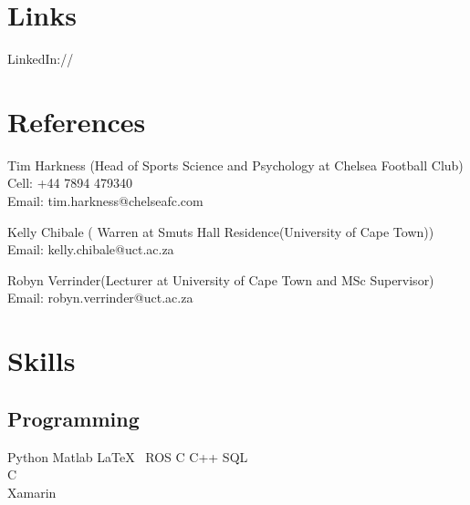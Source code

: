 \documentclass[]{deedy-resume-openfont}
\begin{document}
\begin{minipage}[t]{0.33\textwidth}

\section{Links} 
LinkedIn://  \href{https://www.linkedin.com/in/dikokob}{} \\
\sectionsep


\section{References}

Tim Harkness (Head of Sports Science and Psychology at Chelsea Football Club)\\
Cell: +44 7894 479340 \\
Email: tim.harkness@chelseafc.com \\
\sectionsep

Kelly Chibale ( Warren at Smuts Hall Residence(University of Cape Town))\\
Email: kelly.chibale@uct.ac.za \\
\sectionsep

Robyn Verrinder(Lecturer at University of Cape Town and MSc Supervisor) \\
Email: robyn.verrinder@uct.ac.za \\
\sectionsep

\sectionsep


\section{Skills}
\subsection{Programming}
Python \textbullet{} Matlab \textbullet{} \LaTeX\ \textbullet{} ROS \textbullet{} C \textbullet{} C++ \textbullet{} SQL \\
C\\
Xamarin 
\sectionsep

%
%

\end{minipage} 
\end{document}
